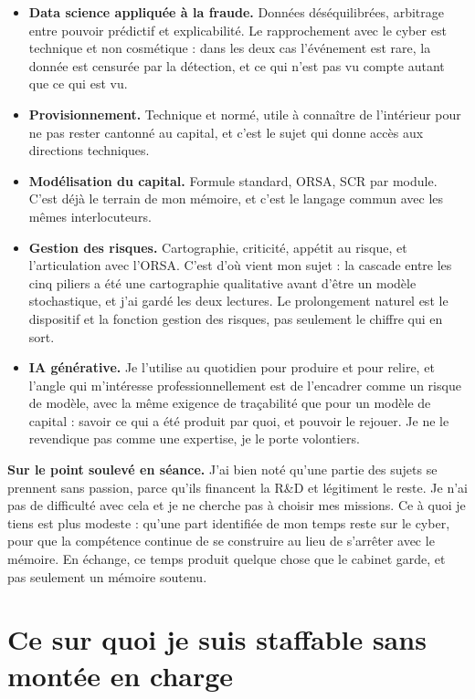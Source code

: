 \documentclass[11pt,a4paper]{article}
\newcommand{\encadre}[2]{%
  \vspace{3pt}\noindent\colorbox{grisclair}{%
  \begin{minipage}{\dimexpr\textwidth-2\fboxsep}
  \footnotesize\textbf{#1} #2
  \end{minipage}}\vspace{3pt}}
\begin{document}
\begin{itemize}
\item \textbf{Data science appliquée à la fraude.} Données déséquilibrées, arbitrage entre
      pouvoir prédictif et explicabilité. Le rapprochement avec le cyber est technique et
      non cosmétique : dans les deux cas l'événement est rare, la donnée est censurée par
      la détection, et ce qui n'est pas vu compte autant que ce qui est vu.
\item \textbf{Provisionnement.} Technique et normé, utile à connaître de l'intérieur pour
      ne pas rester cantonné au capital, et c'est le sujet qui donne accès aux directions
      techniques.
\item \textbf{Modélisation du capital.} Formule standard, ORSA, SCR par module. C'est déjà
      le terrain de mon mémoire, et c'est le langage commun avec les mêmes interlocuteurs.
\item \textbf{Gestion des risques.} Cartographie, criticité, appétit au risque, et
      l'articulation avec l'ORSA. C'est d'où vient mon sujet : la cascade entre les cinq
      piliers a été une cartographie qualitative avant d'être un modèle stochastique, et
      j'ai gardé les deux lectures. Le prolongement naturel est le dispositif et la fonction
      gestion des risques, pas seulement le chiffre qui en sort.
\item \textbf{IA générative.} Je l'utilise au quotidien pour produire et pour relire, et
      l'angle qui m'intéresse professionnellement est de l'encadrer comme un risque de
      modèle, avec la même exigence de traçabilité que pour un modèle de capital : savoir ce
      qui a été produit par quoi, et pouvoir le rejouer. Je ne le revendique pas comme une
      expertise, je le porte volontiers.
\end{itemize}

\encadre{Sur le point soulevé en séance.}{J'ai bien noté qu'une partie des sujets se
prennent sans passion, parce qu'ils financent la R\&D et légitiment le reste. Je n'ai pas de
difficulté avec cela et je ne cherche pas à choisir mes missions. Ce à quoi je tiens est
plus modeste : qu'une part identifiée de mon temps reste sur le cyber, pour que la
compétence continue de se construire au lieu de s'arrêter avec le mémoire. En échange, ce
temps produit quelque chose que le cabinet garde, et pas seulement un mémoire soutenu.}

\section{Ce sur quoi je suis staffable sans montée en charge}
\end{document}
